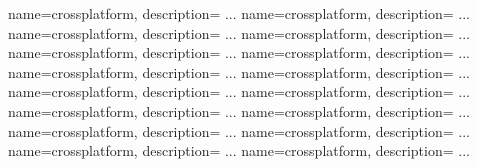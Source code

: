  {
  name=crossplatform,
  description={
		...
	}
}
 {
  name=crossplatform,
  description={
		...
	}
}
 {
  name=crossplatform,
  description={
		...
	}
}
 {
  name=crossplatform,
  description={
		...
	}
}
 {
  name=crossplatform,
  description={
		...
	}
}
 {
  name=crossplatform,
  description={
		...
	}
}
 {
  name=crossplatform,
  description={
		...
	}
}
 {
  name=crossplatform,
  description={
		...
	}
}
 {
  name=crossplatform,
  description={
		...
	}
}
 {
  name=crossplatform,
  description={
		...
	}
}
 {
  name=crossplatform,
  description={
		...
	}
}
 {
  name=crossplatform,
  description={
		...
	}
}
 {
  name=crossplatform,
  description={
		...
	}
}
 {
  name=crossplatform,
  description={
		...
	}
}
 {
  name=crossplatform,
  description={
		...
	}
}
 {
  name=crossplatform,
  description={
		...
	}
}



